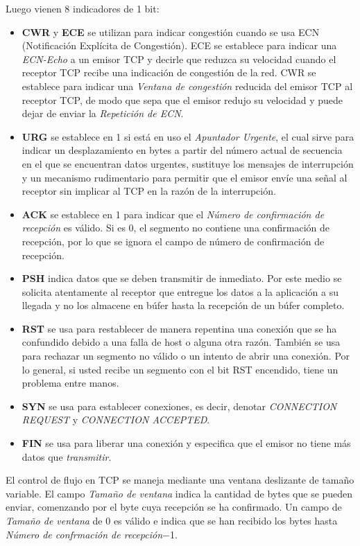 \documentclass[10pt,a4paper]{report}
\begin{document}
	\par Luego vienen 8 indicadores de 1 bit:
		\begin{itemize}
			\item \textbf{CWR} y \textbf{ECE} se utilizan para indicar congestión cuando se 
		usa ECN (Notificación Explícita de Congestión). ECE se establece para indicar una 
		\textit{ECN-Echo} a un emisor TCP y decirle que reduzca su velocidad cuando el 
		receptor TCP recibe una indicación de congestión de la red. CWR se establece 
		para indicar una \textit{Ventana de congestión} reducida del emisor TCP al 
		receptor TCP, de modo que sepa que el emisor redujo su velocidad y puede dejar 
		de enviar la \textit{Repetición de ECN}.
			\item \textbf{URG} se establece en 1 si está en uso el \textit{Apuntador Urgente}, el cual 
		sirve para indicar un desplazamiento en bytes a partir del número actual de 
		secuencia en el que se encuentran datos urgentes, sustituye los mensajes de 
		interrupción y un mecanismo rudimentario para permitir que el emisor envíe una 
		señal al receptor sin implicar al TCP en la razón de la interrupción.
			\item \textbf{ACK} se establece en 1 para indicar que el \textit{Número de confirmación 
		de recepción} es válido. Si es 0, el segmento no contiene una confirmación de 
		recepción, por lo que se ignora el campo de número de confirmación de 
		recepción.
			\item \textbf{PSH} indica datos que se deben transmitir de inmediato. Por este medio se 
		solicita atentamente al receptor que entregue los datos a la aplicación a su 
		llegada y no los almacene en búfer hasta la recepción de un búfer completo.
			\item \textbf{RST} se usa para restablecer de manera repentina una conexión 
		que se ha confundido debido a una falla de host o alguna otra razón. También se 
		usa para rechazar un segmento no válido o un intento de abrir una conexión. Por 
		lo general, si usted recibe un segmento con el bit RST encendido, tiene un 
		problema entre manos.
			\item \textbf{SYN} se usa para establecer conexiones, es decir, denotar 
		\textit{CONNECTION REQUEST} y \textit{CONNECTION ACCEPTED}.
			\item \textbf{FIN} se usa para liberar una conexión y especifica que el emisor no 
		tiene más datos que \textit{transmitir}. 
		\end{itemize}

	\par El control de flujo en TCP se maneja mediante una ventana deslizante de tamaño 
variable. El campo \textit{Tamaño de ventana} indica la cantidad de bytes que se 
pueden enviar, comenzando por el byte cuya recepción se ha confirmado. Un campo 
de \textit{Tamaño de ventana} de 0 es válido e indica que se han recibido los bytes 
hasta \textit{Número de confrmación de recepción}$-$1.
\end{document}

